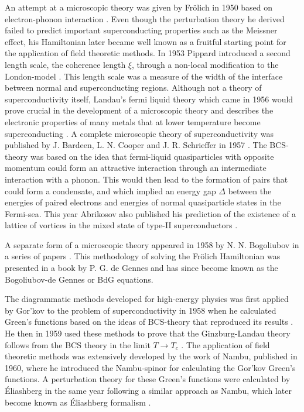 An attempt at a microscopic theory was given by Fr\"olich in 1950 based on electron-phonon interaction \cite{Frolich50}. Even though the perturbation theory he derived
failed to predict important superconducting properties such as the Meissner effect, his Hamiltonian later became well known as a
fruitful starting point for the application of field theoretic methods.
In 1953 Pippard introduced a second length scale, the coherence length $\xi$, through a non-local modification to the London-model \cite{Pippard53}.
This length scale was a measure of the width of the interface between normal and superconducting regions. Although not a theory of superconductivity
itself, Landau's fermi liquid theory which came in 1956 would prove crucial in the development of a microscopic theory and describes the electronic
properties of many metals that at lower temperature become superconducting \cite{Landau56}. A complete microscopic theory of superconductivity was
published by J. Bardeen, L. N. Cooper and J. R. Schrieffer in 1957 \cite{Bardeen57,BCS}. The BCS-theory was based on the idea that fermi-liquid
quasiparticles with opposite momentum could form an attractive interaction through an intermediate interaction with a phonon. This would then lead
to the formation of pairs that could form a condensate, and which implied an energy gap $\Delta$ between the energies of paired electrons
and energies of normal quasiparticle states in the Fermi-sea. This year Abrikosov also published his prediction of the existence of a lattice of
vortices in the mixed state of type-II superconductors \cite{Abrikosov56}.

A separate form of a microscopic theory appeared in 1958 by N. N. Bogoliubov in a series of papers \cite{Bogoliubov58I, Bogoliubov58III, Bogoliubov58}.
This methodology of solving the Fr\"olich Hamiltonian was presented in a book \cite{deGennes66} by P. G. de Gennes and has since become known as
the Bogoliubov-de Gennes or BdG equations.

The diagrammatic methods developed for high-energy physics was first applied by Gor'kov to the
problem of superconductivity in 1958 when he calculated Green's functions based on the ideas of BCS-theory that reproduced
its results \cite{Gorkov58}. He then in 1959 used these methods to prove that the Ginzburg-Landau theory follows from the BCS theory in the limit $T\to T_c$ \cite{Gorkov59}.
The application of field theoretic methods was extensively developed by the work of Nambu, published in 1960, where he introduced the Nambu-spinor
for calculating the Gor'kov Green's functions. A perturbation theory for these Green's functions were calculated by \'Eliashberg in the same year
following a similar approach as Nambu, which later become known as \'Eliashberg formalism \cite{Eliashberg60}.


